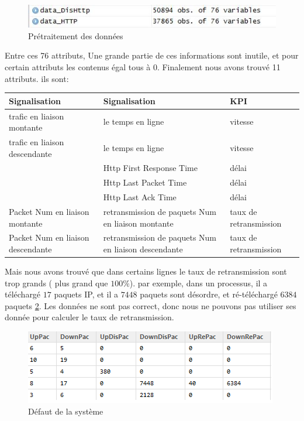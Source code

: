 \begin{figure}[H]
	\centering
	\includegraphics[width=0.8\linewidth]{images/newdata}
	\caption{Prétraitement des données}
	\label{fig:newdata}
\end{figure}

Entre ces 76 attributs, Une grande partie de ces informations sont inutile, et pour certain attributs les contenus égal tous à 0. Finalement nous avons trouvé 11 attributs. ils sont:
\begin{table}[H]
\centering
\begin{tabular}{|>{\centering\arraybackslash}p{3 cm}|>{\centering\arraybackslash}p{3 cm}|>{\centering\arraybackslash}p{3 cm}|}
\hline \rule[-2ex]{0pt}{5.5ex} Signalisation & Signalisation & KPI \\ 
\hline \rule[-2ex]{0pt}{5.5ex} trafic en liaison montante & le temps en ligne & vitesse \\ 
\hline \rule[-2ex]{0pt}{5.5ex} trafic en liaison descendante  & le temps en ligne & vitesse \\ 
\hline \rule[-2ex]{0pt}{5.5ex}  & Http First Response Time & délai \\ 
\hline \rule[-2ex]{0pt}{5.5ex}  & Http Last Packet Time & délai \\ 
\hline \rule[-2ex]{0pt}{5.5ex}  & Http Last Ack Time & délai \\ 
\hline \rule[-2ex]{0pt}{5.5ex}  Packet Num en liaison montante & retransmission de paquets Num en liaison montante & taux de retransmission \\ 
\hline \rule[-2ex]{0pt}{5.5ex}  Packet Num en liaison descendante & retransmission de paquets Num en liaison descendante& taux de retransmission \\ 
\hline 
\end{tabular} 
\end{table}


Mais nous avons trouvé que dans certains lignes le taux de retransmission sont trop grands ( plus grand que $100\%$). par exemple, dans un processus, il a téléchargé  $17$ paquets IP, et il a  $7448$  paquets sont désordre, et  ré-téléchargé  $6384$ paquets  \ref{fig:défaut}. Les données ne sont pas correct, donc nous ne pouvons pas utiliser ses donnée pour calculer le taux de retransmission.  
\begin{figure}[H]
	\centering
	\includegraphics[width=0.7\linewidth]{images/11}
	\caption{Défaut de la système}
	\label{fig:défaut}
\end{figure}

